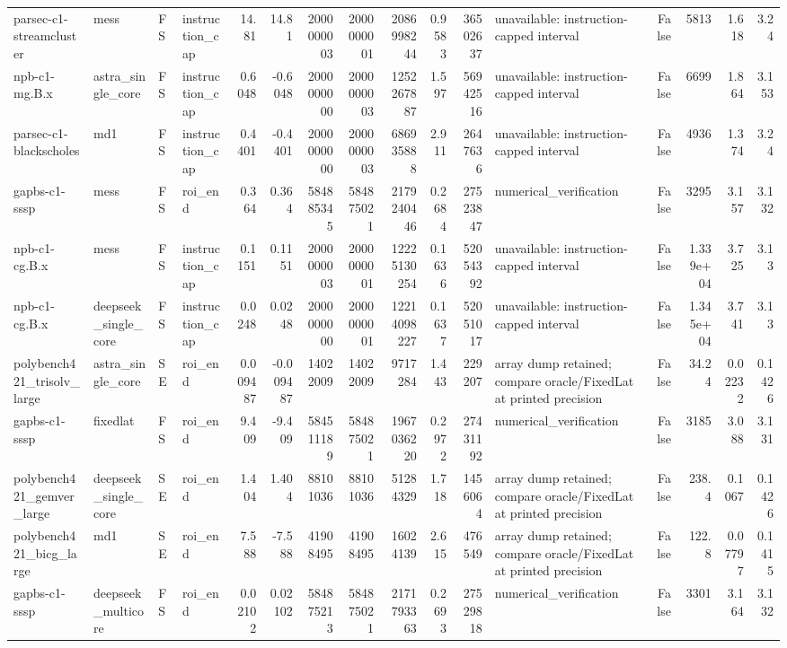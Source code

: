 \begin{tabular}{llllrrrrrrrlrrrr}
parsec-c1-streamcluster & mess & FS & instruction\_cap & 14.81 & 14.81 & 2000000003 & 2000000001 & 2086998244 & 0.9583 & 36502637 & unavailable: instruction-capped interval & False & 5813 & 1.618 & 3.24 \\
npb-c1-mg.B.x & astra\_single\_core & FS & instruction\_cap & 0.6048 & -0.6048 & 2000000000 & 2000000003 & 1252267887 & 1.597 & 56942516 & unavailable: instruction-capped interval & False & 6699 & 1.864 & 3.153 \\
parsec-c1-blackscholes & md1 & FS & instruction\_cap & 0.4401 & -0.4401 & 2000000000 & 2000000003 & 686935888 & 2.911 & 2647636 & unavailable: instruction-capped interval & False & 4936 & 1.374 & 3.24 \\
gapbs-c1-sssp & mess & FS & roi\_end & 0.364 & 0.364 & 584885345 & 584875021 & 2179240446 & 0.2684 & 27523847 & numerical\_verification & False & 3295 & 3.157 & 3.132 \\
npb-c1-cg.B.x & mess & FS & instruction\_cap & 0.1151 & 0.1151 & 2000000003 & 2000000001 & 12225130254 & 0.1636 & 52054392 & unavailable: instruction-capped interval & False & 1.339e+04 & 3.725 & 3.13 \\
npb-c1-cg.B.x & deepseek\_single\_core & FS & instruction\_cap & 0.0248 & 0.0248 & 2000000000 & 2000000001 & 12214098227 & 0.1637 & 52051017 & unavailable: instruction-capped interval & False & 1.345e+04 & 3.741 & 3.13 \\
polybench421\_trisolv\_large & astra\_single\_core & SE & roi\_end & 0.009487 & -0.009487 & 14022009 & 14022009 & 9717284 & 1.443 & 229207 & array dump retained; compare oracle/FixedLat at printed precision & False & 34.24 & 0.02232 & 0.1426 \\
gapbs-c1-sssp & fixedlat & FS & roi\_end & 9.409 & -9.409 & 584511189 & 584875021 & 1967036220 & 0.2972 & 27431192 & numerical\_verification & False & 3185 & 3.088 & 3.131 \\
polybench421\_gemver\_large & deepseek\_single\_core & SE & roi\_end & 1.404 & 1.404 & 88101036 & 88101036 & 51284329 & 1.718 & 1456064 & array dump retained; compare oracle/FixedLat at printed precision & False & 238.4 & 0.1067 & 0.1426 \\
polybench421\_bicg\_large & md1 & SE & roi\_end & 7.588 & -7.588 & 41908495 & 41908495 & 16024139 & 2.615 & 476549 & array dump retained; compare oracle/FixedLat at printed precision & False & 122.8 & 0.07797 & 0.1415 \\
gapbs-c1-sssp & deepseek\_multicore & FS & roi\_end & 0.02102 & 0.02102 & 584875213 & 584875021 & 2171793363 & 0.2693 & 27529818 & numerical\_verification & False & 3301 & 3.164 & 3.132 \\

\end{tabular}
